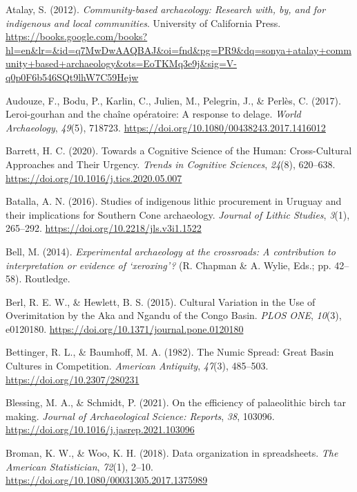 \documentclass[
  11pt,
  letterpaper,
  DIV=11,
  numbers=noendperiod]{scrartcl}
\newlength{\cslhangindent}
\newenvironment{CSLReferences}[2] %
 {\begin{list}{}{%
  \setlength{\itemindent}{0pt}
  \setlength{\leftmargin}{0pt}
  \setlength{\parsep}{0pt}
  \ifodd #1
   \setlength{\leftmargin}{\cslhangindent}
   \setlength{\itemindent}{-1\cslhangindent}
  \fi
  \setlength{\itemsep}{#2\baselineskip}}}
 {\end{list}}
\begin{document}
\begin{CSLReferences}{1}{0}
Atalay, S. (2012). \emph{Community-based archaeology: Research with, by,
and for indigenous and local communities}. University of California
Press.
\url{https://books.google.com/books?hl=en&lr=&id=q7MwDwAAQBAJ&oi=fnd&pg=PR9&dq=sonya+atalay+community+based+archaeology&ots=EoTKMq3e9j&sig=V-q0p0F6b546SQt9lhW7C59Hejw}

Audouze, F., Bodu, P., Karlin, C., Julien, M., Pelegrin, J., \& Perlès,
C. (2017). Leroi-gourhan and the chaîne opératoire: A response to
delage. \emph{World Archaeology}, \emph{49}(5), 718723.
\url{https://doi.org/10.1080/00438243.2017.1416012}

Barrett, H. C. (2020). Towards a Cognitive Science of the Human:
Cross-Cultural Approaches and Their Urgency. \emph{Trends in Cognitive
Sciences}, \emph{24}(8), 620--638.
\url{https://doi.org/10.1016/j.tics.2020.05.007}

Batalla, A. N. (2016). Studies of indigenous lithic procurement in
Uruguay and their implications for Southern Cone archaeology.
\emph{Journal of Lithic Studies}, \emph{3}(1), 265--292.
\url{https://doi.org/10.2218/jls.v3i1.1522}

Bell, M. (2014). \emph{Experimental archaeology at the crossroads: A
contribution to interpretation or evidence of {`}xeroxing{'}?} (R.
Chapman \& A. Wylie, Eds.; pp. 42--58). Routledge.

Berl, R. E. W., \& Hewlett, B. S. (2015). Cultural Variation in the Use
of Overimitation by the Aka and Ngandu of the Congo Basin. \emph{PLOS
ONE}, \emph{10}(3), e0120180.
\url{https://doi.org/10.1371/journal.pone.0120180}

Bettinger, R. L., \& Baumhoff, M. A. (1982). The Numic Spread: Great
Basin Cultures in Competition. \emph{American Antiquity}, \emph{47}(3),
485--503. \url{https://doi.org/10.2307/280231}

Blessing, M. A., \& Schmidt, P. (2021). On the efficiency of
palaeolithic birch tar making. \emph{Journal of Archaeological Science:
Reports}, \emph{38}, 103096.
\url{https://doi.org/10.1016/j.jasrep.2021.103096}

Broman, K. W., \& Woo, K. H. (2018). Data organization in spreadsheets.
\emph{The American Statistician}, \emph{72}(1), 2--10.
\url{https://doi.org/10.1080/00031305.2017.1375989}


\end{CSLReferences}
\end{document}

